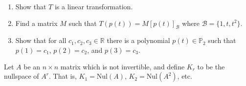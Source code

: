 \documentclass[12pt,letterpaper]{article}
\begin{document}
\begin{enumerate}
	\begin{enumerate}
		\item Show that $T$ is a linear transformation.
		\item Find a matrix $M$ such that $T(p(t)) = M[p(t)]_{\mathcal{B}}$ where $\mathcal{B} = \{1,t,t^2\}$.
		\item Show that for all $c_1, c_2, c_3 \in \mathbb{R}$ there is a polynomial $p(t) \in \mathbb{P}_2$ such that $p(1) = c_1$, $p(2) = c_2$, and $p(3) = c_3$.
	\end{enumerate}
	

	

%		
	
	
\Problem
	Let $A$ be an $n\times n$ matrix which is not invertible, and define $K_r$ to be the nullspace of $A^r$.  That is, $K_1 = \mbox{Nul}(A)$, $K_2 = \mbox{Nul}(A^2)$, etc.
	

\end{enumerate}
\end{document}
